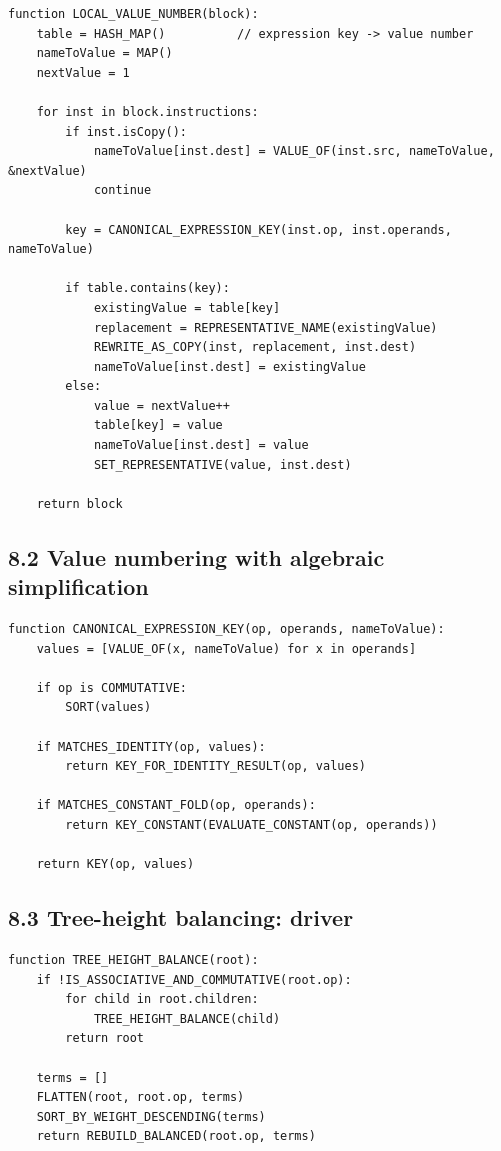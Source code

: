 \documentclass[10pt,letterpaper]{article}
\begin{document}
\begin{verbatim}
function LOCAL_VALUE_NUMBER(block):
    table = HASH_MAP()          // expression key -> value number
    nameToValue = MAP()
    nextValue = 1

    for inst in block.instructions:
        if inst.isCopy():
            nameToValue[inst.dest] = VALUE_OF(inst.src, nameToValue, &nextValue)
            continue

        key = CANONICAL_EXPRESSION_KEY(inst.op, inst.operands, nameToValue)

        if table.contains(key):
            existingValue = table[key]
            replacement = REPRESENTATIVE_NAME(existingValue)
            REWRITE_AS_COPY(inst, replacement, inst.dest)
            nameToValue[inst.dest] = existingValue
        else:
            value = nextValue++
            table[key] = value
            nameToValue[inst.dest] = value
            SET_REPRESENTATIVE(value, inst.dest)

    return block
\end{verbatim}

\subsection*{8.2 Value numbering with algebraic simplification}

\begin{verbatim}
function CANONICAL_EXPRESSION_KEY(op, operands, nameToValue):
    values = [VALUE_OF(x, nameToValue) for x in operands]

    if op is COMMUTATIVE:
        SORT(values)

    if MATCHES_IDENTITY(op, values):
        return KEY_FOR_IDENTITY_RESULT(op, values)

    if MATCHES_CONSTANT_FOLD(op, operands):
        return KEY_CONSTANT(EVALUATE_CONSTANT(op, operands))

    return KEY(op, values)
\end{verbatim}

\subsection*{8.3 Tree-height balancing: driver}

\begin{verbatim}
function TREE_HEIGHT_BALANCE(root):
    if !IS_ASSOCIATIVE_AND_COMMUTATIVE(root.op):
        for child in root.children:
            TREE_HEIGHT_BALANCE(child)
        return root

    terms = []
    FLATTEN(root, root.op, terms)
    SORT_BY_WEIGHT_DESCENDING(terms)
    return REBUILD_BALANCED(root.op, terms)
\end{verbatim}
\end{document}
